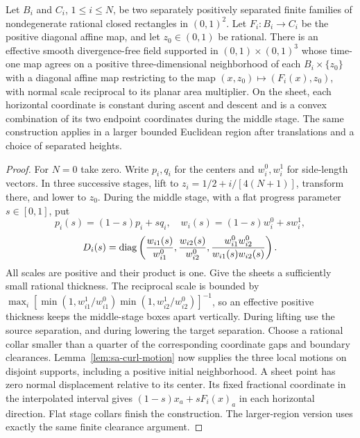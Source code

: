 \begin{lemma}\label{lem:sa-sheet-routing}
Let $B_i$ and $C_i$, $1\le i\le N$, be two separately positively
separated finite families of nondegenerate rational closed rectangles
in $(0,1)^2$.  Let $F_i:B_i\to C_i$ be the positive diagonal affine
map, and let $z_0\in(0,1)$ be rational.  There is an effective
smooth divergence-free field supported in $(0,1)\times(0,1)^3$ whose
time-one map agrees on a positive three-dimensional neighborhood of each
$B_i\times\{z_0\}$ with a diagonal affine map restricting to the
map $(x,z_0)\mapsto(F_i(x),z_0)$, with normal scale
reciprocal to its planar area multiplier.  On the
sheet, each horizontal coordinate is constant during ascent and descent
and is a convex combination of its two endpoint coordinates during the
middle stage.  The same construction applies in a larger bounded
Euclidean region after translations and a choice of separated heights.
\end{lemma}
\begin{proof}
For $N=0$ take zero.  Write $p_i,q_i$ for the centers and $w_i^0,w_i^1$
for side-length vectors.  In three successive stages, lift to
$z_i=1/2+i/[4(N+1)]$, transform there, and lower to $z_0$.  During the
middle stage, with a flat progress parameter $s\in[0,1]$, put
\[
 p_i(s)=(1-s)p_i+sq_i,\quad w_i(s)=(1-s)w_i^0+sw_i^1,
\]
\[
 D_i(s)=\operatorname{diag}\left(\frac{w_{i1}(s)}{w_{i1}^0},
 \frac{w_{i2}(s)}{w_{i2}^0},
 \frac{w_{i1}^0w_{i2}^0}{w_{i1}(s)w_{i2}(s)}\right).
\]
All scales are positive and their product is one.  Give the sheets a
sufficiently small rational thickness.  The reciprocal scale is bounded
by $\max_i[\min(1,w_{i1}^1/w_{i1}^0)
\min(1,w_{i2}^1/w_{i2}^0)]^{-1}$, so an effective positive thickness
keeps the middle-stage boxes apart vertically.  During lifting use the
source separation, and during lowering the target separation.  Choose a
rational collar smaller than a quarter of the corresponding coordinate
gaps and boundary clearances.  Lemma~\ref{lem:sa-curl-motion} now supplies
the three local motions on disjoint supports, including a positive initial
neighborhood.  A sheet point has zero normal displacement relative to its
center.  Its fixed fractional coordinate in the interpolated interval
gives $(1-s)x_a+sF_i(x)_a$ in each horizontal direction.  Flat stage
collars finish the construction.  The larger-region version uses exactly
the same finite clearance argument.
\end{proof}

